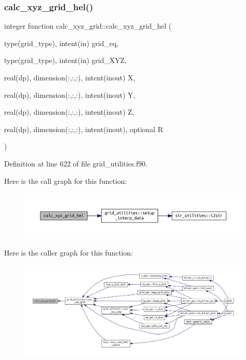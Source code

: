 \subsubsection{\texorpdfstring{calc\+\_\+xyz\+\_\+grid\+\_\+hel()}{calc\_xyz\_grid\_hel()}}
{\footnotesize\ttfamily integer function calc\+\_\+xyz\+\_\+grid\+::calc\+\_\+xyz\+\_\+grid\+\_\+hel (\begin{DoxyParamCaption}\item[{type(grid\+\_\+type), intent(in)}]{grid\+\_\+eq,  }\item[{type(grid\+\_\+type), intent(in)}]{grid\+\_\+\+X\+YZ,  }\item[{real(dp), dimension(\+:,\+:,\+:), intent(inout)}]{X,  }\item[{real(dp), dimension(\+:,\+:,\+:), intent(inout)}]{Y,  }\item[{real(dp), dimension(\+:,\+:,\+:), intent(inout)}]{Z,  }\item[{real(dp), dimension(\+:,\+:,\+:), intent(inout), optional}]{R }\end{DoxyParamCaption})}



Definition at line 622 of file grid\+\_\+utilities.\+f90.

Here is the call graph for this function\+:
\nopagebreak
\begin{figure}[H]
\begin{center}
\leavevmode
\includegraphics[width=350pt]{grid__utilities_8f90_ad39ac81f24bae991c679caf84a4ad757_cgraph}
\end{center}
\end{figure}
Here is the caller graph for this function\+:
\nopagebreak
\begin{figure}[H]
\begin{center}
\leavevmode
\includegraphics[width=350pt]{grid__utilities_8f90_ad39ac81f24bae991c679caf84a4ad757_icgraph}
\end{center}
\end{figure}
\mbox{\label{grid__utilities_8f90_aaabf4a8fdce3679e99ff8f8a9a30fcaf}} 

